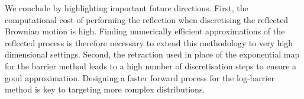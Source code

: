 We conclude by highlighting important future directions.
First, the computational cost of performing the reflection when discretising the reflected Brownian motion is high.
Finding numerically efficient approximations of the reflected process is therefore necessary to extend this methodology to very high dimensional settings.
Second, the retraction used in place of the exponential map for the barrier method leads to a high number of discretisation steps to ensure a good approximation.
Designing a faster forward process for the log-barrier method is key to targeting more complex distributions.
